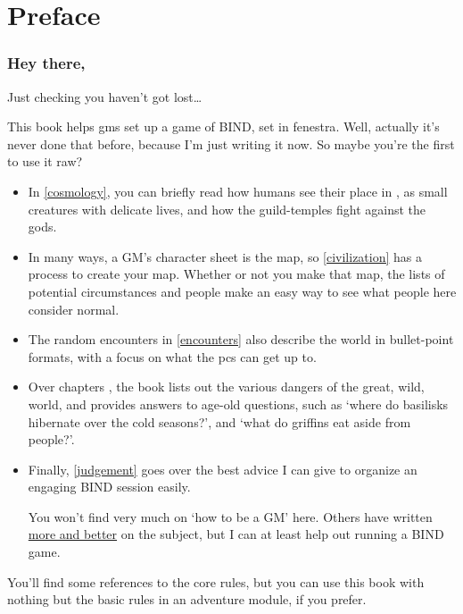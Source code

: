 \chapter{Preface}

\begin{multicols}{2}

\subsection{Hey there,}

Just checking you haven't got lost\ldots

This book helps \glspl{gm} set up a game of BIND, set in \gls{fenestra}.
Well, actually it's never done that before, because I'm just writing it now.
So maybe you're the first to use it raw?

\begin{itemize}
  \item
  In \autoref{cosmology}, you can briefly read how humans see their place in , as small creatures with delicate lives, and how the guild-temples fight against the gods.
  \item
  In many ways, a GM's character sheet is the map, so \autoref{civilization} has a process to create your map.
  Whether or not you make that map, the lists of potential circumstances and people make an easy way to see what people here consider normal.
  \item
  The random encounters in \autoref{encounters} also describe the world in bullet-point formats, with a focus on what the \glspl{pc} can get up to.
  \item
  Over chapters , the book lists out the various dangers of the great, wild, world, and provides answers to age-old questions, such as `where do basilisks hibernate over the cold seasons?', and `what do griffins eat aside from people?'.
  \item
  Finally, \autoref{judgement} goes over the best advice I can give to organize an engaging BIND session easily.

  You won't find very much on `how to be a GM' here.
  Others have written \href{https://theangrygm.com}{more and better} on the subject, but I can at least help out running a BIND game.
\end{itemize}

You'll find some references to the core rules, but you can use this book with nothing but the basic rules in an adventure module, if you prefer.


\end{multicols}
